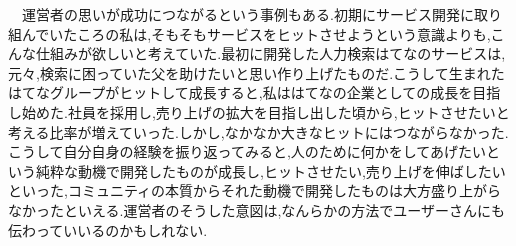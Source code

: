 \documentclass[uplatex,twocolumn,dvipdfmx]{jsarticle}
\begin{document}
　運営者の思いが成功につながるという事例もある.初期にサービス開発に取り組んでいたころの私は,そもそもサービスをヒットさせようという意識よりも,こんな仕組みが欲しいと考えていた.最初に開発した人力検索はてなのサービスは,元々,検索に困っていた父を助けたいと思い作り上げたものだ.こうして生まれたはてなグループがヒットして成長すると,私ははてなの企業としての成長を目指し始めた.社員を採用し,売り上げの拡大を目指し出した頃から,ヒットさせたいと考える比率が増えていった.しかし,なかなか大きなヒットにはつながらなかった.こうして自分自身の経験を振り返ってみると,人のために何かをしてあげたいという純粋な動機で開発したものが成長し,ヒットさせたい,売り上げを伸ばしたいといった,コミュニティの本質からそれた動機で開発したものは大方盛り上がらなかったといえる.運営者のそうした意図は,なんらかの方法でユーザーさんにも伝わっていいるのかもしれない.



\end{document}
